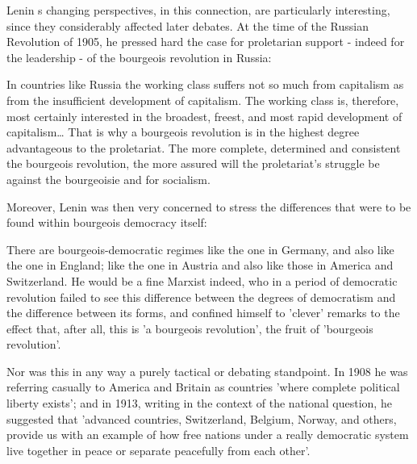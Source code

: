 Lenin s changing perspectives, in this connection, are particularly interesting, since they considerably affected later debates. At the time of the Russian Revolution of 1905, he pressed hard the case for proletarian support - indeed for the leadership - of the bourgeois revolution in Russia:
\begin{displayquote}
    In countries like Russia the working class suffers not so much from capitalism as from the insufficient development of capitalism. The working class is, therefore, most certainly interested in the broadest, freest, and most rapid development of capitalism\dots{} That is why a bourgeois revolution is in the highest degree advantageous to the proletariat. The more complete, determined and consistent the bourgeois revolution, the more assured will the proletariat's struggle be against the bourgeoisie and for socialism.
\end{displayquote}

Moreover, Lenin was then very concerned to stress the differences that were to be found within bourgeois democracy itself:
\begin{displayquote}
    There are bourgeois-democratic regimes like the one in Germany, and also like the one in England; like the one in Austria and also like those in America and Switzerland. He would be a fine Marxist indeed, who in a period of democratic revolution failed to see this difference between the degrees of democratism and the difference between its forms, and confined himself to 'clever' remarks to the effect that, after all, this is 'a bourgeois revolution', the fruit of 'bourgeois revolution'.
\end{displayquote}

Nor was this in any way a purely tactical or debating standpoint. In 1908 he was referring casually to America and Britain as countries 'where complete political liberty exists'; and in 1913, writing in the context of the national question, he suggested that 'advanced countries, Switzerland, Belgium, Norway, and others, provide us with an example of how free nations under a really democratic system live together in peace or separate peacefully from each other'.

